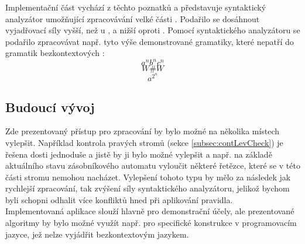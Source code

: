 Implementační část vychází z těchto poznatků a představuje syntaktický analyzátor
umožňující zpracovávání velké části . Podařilo se
dosáhnout vyjadřovací síly vyšší, než u ,
a nižší oproti .
Pomocí syntaktického analyzátoru se podařilo zpracovávat např. tyto
výše demonstrované gramatiky, které nepatří do gramatik
bezkontextových \cite[str. 29]{Koutny}:
\[ a^nb^nc^n \]
\[ W\#W \]
\[ a^{2^n} \]
\subsection*{Budoucí vývoj}

Zde prezentovaný přístup pro zpracování  by
bylo možné na několika místech vylepšit. Například kontrola pravých stromů
(sekce \ref{subsec:contLevCheck}) je řešena dosti jednoduše a jistě by ji bylo možné
vylepšit a např. na základě aktuálního stavu zásobníkového automatu vyloučit některé
řetězce, které se v této části stromu nemohou nacházet.
Vylepšení tohoto typu by mělo za následek jak rychlejší zpracování, tak zvýšení síly
syntaktického analyzátoru, jelikož bychom byli schopni odhalit více konfliktů
hned při aplikování pravidla.\\

Implementovaná aplikace slouží hlavně pro demonstrační účely, ale prezentované
algoritmy by bylo možné využít např. pro specifické konstrukce v programovacím
jazyce, jež nelze vyjádřit bezkontextovým jazykem.

